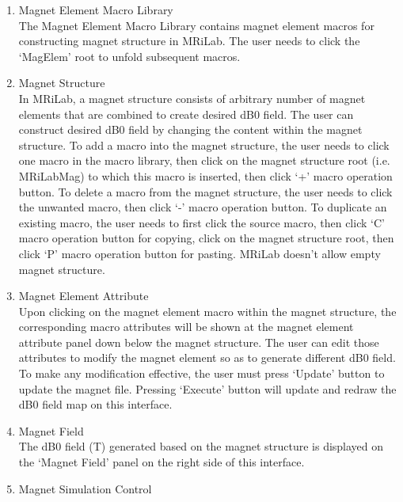 \documentclass{book}%
\begin{document}
\begin{enumerate}
	\item Magnet Element Macro Library \\
	
The Magnet Element Macro Library contains magnet element macros for constructing magnet structure in MRiLab. The user needs to click the `MagElem' root to unfold subsequent macros.
	
	\item Magnet Structure \\
	
In MRiLab, a magnet structure consists of arbitrary number of magnet elements that are combined to create desired dB0 field. The user can construct desired dB0 field by changing the content within the magnet structure. To add a macro into the magnet structure, the user needs to click one macro in the macro library, then click on the magnet structure root (i.e. MRiLabMag) to which this macro is inserted, then click `+' macro operation button. To delete a macro from the magnet structure, the user needs to click the unwanted macro, then click `-' macro operation button. To duplicate an existing macro, the user needs to first click the source macro, then click `C' macro operation button for copying, click on the magnet structure root, then click `P' macro operation button for pasting. MRiLab doesn't allow empty magnet structure.
	
	\item Magnet Element Attribute \\
	
Upon clicking on the magnet element macro within the magnet structure, the corresponding macro attributes will be shown at the magnet element attribute panel down below the magnet structure. The user can edit those attributes to modify the magnet element so as to generate different dB0 field. To make any modification effective, the user must press `Update' button to update the magnet file. Pressing `Execute' button will update and redraw the dB0 field map on this interface.	
	
	\item Magnet Field \\
	
The dB0 field (T) generated based on the magnet structure is displayed on the `Magnet Field' panel on the right side of this interface.
	
	\item Magnet Simulation Control \\
	

\end{enumerate}
\end{document}
